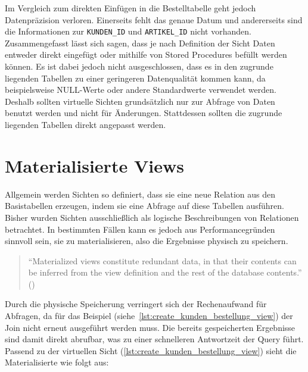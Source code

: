Im Vergleich zum direkten Einfügen in die Bestelltabelle geht jedoch Datenpräzision verloren.
Einerseits fehlt das genaue Datum und andererseits sind die Informationen zur \texttt{KUNDEN\_ID} und \texttt{ARTIKEL\_ID} nicht vorhanden.
Zusammengefasst lässt sich sagen, dass je nach Definition der Sicht Daten entweder direkt eingefügt oder mithilfe von Stored Procedures befüllt werden können.
Es ist dabei jedoch nicht ausgeschlossen, dass es in den zugrunde liegenden Tabellen zu einer geringeren Datenqualität kommen kann, da beispielsweise NULL-Werte oder andere Standardwerte verwendet werden.
Deshalb sollten virtuelle Sichten grundsätzlich nur zur Abfrage von Daten benutzt werden und nicht für Änderungen.
Stattdessen sollten die zugrunde liegenden Tabellen direkt angepasst werden.

\section{Materialisierte Views}\label{sec:materialisierte-views}

Allgemein werden Sichten so definiert, dass sie eine neue Relation aus den Basistabellen erzeugen, indem sie eine Abfrage auf diese Tabellen ausführen.
Bisher wurden Sichten ausschließlich als logische Beschreibungen von Relationen betrachtet.
In bestimmten Fällen kann es jedoch aus Performancegründen sinnvoll sein, sie zu materialisieren, also die Ergebnisse physisch zu speichern.

\begin{quote}
    \enquote{Materialized views constitute redundant data, in that their contents can be inferred from the view definition and the rest of the database contents.} (\cite[S. 607]{silberschatz2011database})
\end{quote}

Durch die physische Speicherung verringert sich der Rechenaufwand für Abfragen, da für das Beispiel (siehe~\ref{lst:create_kunden_bestellung_view}) der Join nicht erneut ausgeführt werden muss.
Die bereits gespeicherten Ergebnisse sind damit direkt abrufbar, was zu einer schnelleren Antwortzeit der Query führt.
Passend zu der virtuellen Sicht (\ref{lst:create_kunden_bestellung_view}) sieht die Materialisierte wie folgt aus:

\vspace{-5pt}


